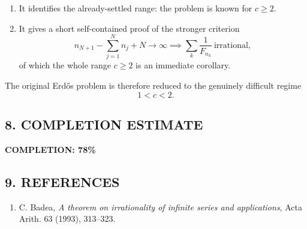 \begin{enumerate}
\item It identifies the already-settled range: the problem is known for $c\ge 2$.
\item It gives a short self-contained proof of the stronger criterion
\[
 n_{N+1}-\sum_{j=1}^{N}n_j+N\to\infty
 \implies
 \sum_k \frac1{F_{n_k}}\ \mbox{irrational},
\]
of which the whole range $c\ge 2$ is an immediate corollary.
\end{enumerate}

The original Erd\H{o}s problem is therefore reduced to the genuinely difficult regime
\[
1<c<2.
\]

\subsection*{8. COMPLETION ESTIMATE}

\textbf{COMPLETION: 78\%}

\subsection*{9. REFERENCES}

\begin{enumerate}
\item C. Badea, \emph{A theorem on irrationality of infinite series and applications}, Acta Arith. 63 (1993), 313--323.
\end{enumerate}
